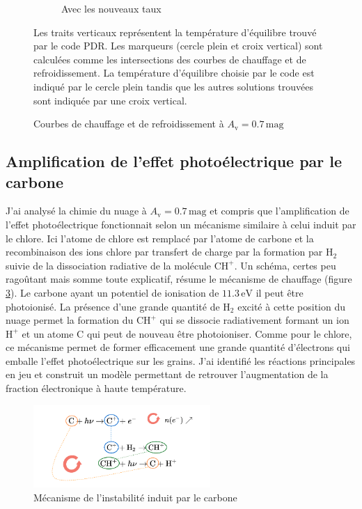 \begin{figure}[!h]
\begin{subfigure}[t]{0.49\textwidth}
        \caption{Avec les nouveaux taux}
         \label{fig:H2:Bossion:cooling}
    \end{subfigure}
    \caption{Courbes de chauffage et de refroidissement à $A_\mathrm{v}=0.7\,\mathrm{mag}$}
    \begin{minipage}{\textwidth}
    Les traits verticaux représentent la température d'équilibre trouvé par le code PDR. Les marqueurs (cercle plein et croix vertical) sont calculées comme les intersections des courbes de chauffage et de refroidissement. La température d'équilibre choisie par le code est indiqué par le cercle plein tandis que les autres solutions trouvées sont indiquée par une croix vertical.
    \end{minipage}
\end{figure}


\subsection{Amplification de l'effet photoélectrique par le carbone}

J'ai analysé la chimie du nuage à $A_\mathrm{v} = 0.7\,\mathrm{mag}$ et compris que l'amplification de l'effet photoélectrique fonctionnait selon un mécanisme similaire à celui induit par le chlore. Ici l'atome de chlore est remplacé par l'atome de carbone et la recombinaison des ions chlore par transfert de charge par la formation par $\mathrm{H}_2$ suivie de la dissociation radiative de la molécule $\mathrm{CH}^+$. Un schéma, certes peu ragoûtant mais somme toute explicatif, résume le mécanisme de chauffage (figure \ref{fig:H2:meca:C}). Le carbone ayant un potentiel de ionisation de $11.3\,\mathrm{eV}$ il peut être photoionisé. La présence d'une grande quantité de $\mathrm{H}_2$ excité à cette position du nuage permet la formation du $\mathrm{CH}^+$ qui se dissocie radiativement formant un ion $\mathrm{H}^+$ et un atome $\mathrm{C}$ qui peut de nouveau être photoioniser. Comme pour le chlore, ce mécanisme permet de former efficacement une grande quantité d'électrons qui emballe l'effet photoélectrique sur les grains. J'ai identifié les réactions principales en jeu et construit un modèle permettant de retrouver l'augmentation de la fraction électronique à haute température.

\begin{figure}[!h]
    \centering \includegraphics[trim = {0 0 0 1cm},clip,width=0.6\textwidth]{figure/H2/pic/scheme_pic.png}
    \caption{Mécanisme de l'instabilité induit par le carbone}
    \label{fig:H2:meca:C}
\end{figure}


